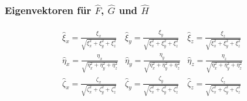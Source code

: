 \subsubsection{Eigenvektoren für $\hat{F}$, $\hat{G}$ und $\hat{H}$}
\begin{align*}
\begin{matrix}
\hat{\xi}_x=\frac{\xi_x}{\sqrt{\xi_x^2+\xi_y^2+\xi_z^2}}
&
\hat{\xi}_y=\frac{\xi_y}{\sqrt{\xi_x^2+\xi_y^2+\xi_z^2}}
&
\hat{\xi}_z=\frac{\xi_z}{\sqrt{\xi_x^2+\xi_y^2+\xi_z^2}}
\\
\hat{\eta}_x=\frac{\eta_x}{\sqrt{\eta_x^2+\eta_y^2+\eta_z^2}}
&
\hat{\eta}_y=\frac{\eta_y}{\sqrt{\eta_x^2+\eta_y^2+\eta_z^2}}
&
\hat{\eta}_z=\frac{\eta_z}{\sqrt{\eta_x^2+\eta_y^2+\eta_z^2}}
\\
\hat{\zeta}_x=\frac{\zeta_x}{\sqrt{\zeta_x^2+\zeta_y^2+\zeta_z^2}}
&
\hat{\zeta}_y=\frac{\zeta_y}{\sqrt{\zeta_x^2+\zeta_y^2+\zeta_z^2}}
&
\hat{\zeta}_z=\frac{\zeta_z}{\sqrt{\zeta_x^2+\zeta_y^2+\zeta_z^2}}
\end{matrix}
\end{align*}

